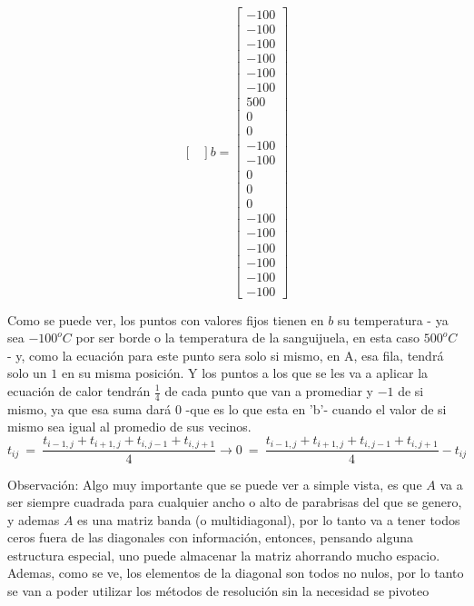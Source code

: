 \documentclass[a4paper]{article}
\begin{document}
\[\begin{bmatrix}
\end{bmatrix}
 b =
\begin{bmatrix}
  -100 \\
  -100 \\
  -100 \\
  -100 \\
  -100 \\
  -100 \\
  500 \\
  0 \\
  0 \\
  -100 \\
  -100 \\
  0 \\
  0 \\
  0 \\
  -100 \\
  -100 \\
  -100 \\
  -100 \\
  -100 \\
  -100

\end{bmatrix}
\]

Como se puede ver, los puntos con valores fijos tienen en $b$ su temperatura - ya sea $-100^oC$ por ser borde o la temperatura de la sanguijuela, en esta caso $500^oC$ - y, como la ecuación para este punto sera solo si mismo, en A, esa fila, tendrá solo un $1$ en su misma posición. 
Y los puntos a los que se les va a aplicar la ecuación de calor tendrán $\frac{1}{4}$ de cada punto que van a promediar y $-1$ de si mismo, ya que esa suma dará 0 -que es lo que esta en 'b'- cuando el valor de si mismo sea igual al promedio de sus vecinos.
\begin{equation}
t_{ij} \ =\ \frac{ t_{i-1,j} + t_{i+1,j} + t_{i,j-1} + t_{i,j+1}}{4} \rightarrow 0 \ =\ \frac{ t_{i-1,j} + t_{i+1,j} + t_{i,j-1} + t_{i,j+1}}{4} - t_{ij} \label{eq:calordd}
\end{equation}

Observación: Algo muy importante que se puede ver a simple vista, es que $A$ va a ser siempre cuadrada para cualquier ancho o alto de parabrisas del que se genero, y ademas $A$ es una matriz banda (o multidiagonal), por lo tanto va a tener todos ceros fuera de las diagonales con información, entonces, pensando alguna estructura especial, uno puede almacenar la matriz ahorrando mucho espacio. Ademas, como se ve, los elementos de la diagonal son todos no nulos, por lo tanto se van a poder utilizar los métodos de resolución sin la necesidad se pivoteo
\end{document}
